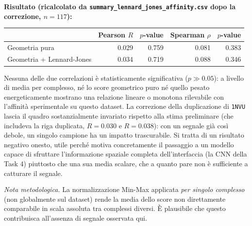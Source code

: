 \documentclass[11pt,a4paper]{article}
\begin{document}
\textbf{Risultato (ricalcolato da \texttt{summary\_lennard\_jones\_affinity.csv} dopo la correzione, $n=117$):}
\begin{center}
\begin{tabular}{lrrrr}
\toprule
& Pearson $R$ & $p$-value & Spearman $\rho$ & $p$-value \\
\midrule
Geometria pura & 0.029 & 0.759 & 0.081 & 0.383 \\
Geometria + Lennard-Jones & 0.034 & 0.719 & 0.088 & 0.346 \\
\bottomrule
\end{tabular}
\end{center}
 
Nessuna delle due correlazioni è statisticamente significativa ($p \gg 0.05$): a livello di media per complesso, né lo score geometrico puro né quello pesato energeticamente mostrano una relazione lineare o monotona rilevabile con l'affinità sperimentale su questo dataset. La correzione della duplicazione di \texttt{1NVU} lascia il quadro sostanzialmente invariato rispetto alla stima preliminare (che includeva la riga duplicata, $R=0.030$ e $R=0.038$): con un segnale già così debole, un singolo campione ha un impatto trascurabile. Si tratta di un risultato negativo onesto, utile perché motiva concretamente il passaggio a un modello capace di sfruttare l'informazione spaziale completa dell'interfaccia (la CNN della Task 4) piuttosto che una sua media scalare, che a quanto pare non è sufficiente a catturare il segnale.
 
\emph{Nota metodologica.} La normalizzazione Min-Max applicata \emph{per singolo complesso} (non globalmente sul dataset) rende la media dello score non direttamente comparabile in scala assoluta tra complessi diversi. È plausibile che questo contribuisca all'assenza di segnale osservata qui.
 
\end{document}
